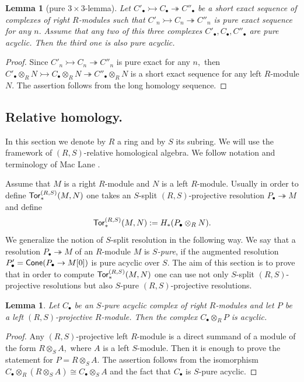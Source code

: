 \documentclass{amsart}
\numberwithin{equation}{section}
\newtheorem{lemma}[theorem]{Lemma}
\theoremstyle{definition}
\def\epi{\twoheadrightarrow}
\def\mono{\rightarrowtail}
\begin{document}
\begin{lemma}[pure $3\times 3$-lemma]\label{lemma_3x3} Let $C'_\bullet \mono C_\bullet \epi C''_\bullet$ be a short exact sequence of complexes of right $R$-modules such that 
$C'_n\mono C_n \epi C''_n$ is pure exact sequence for any $n.$ Assume that any two of this three  complexes $C'_\bullet,C_\bullet,C''_\bullet$ are pure acyclic. Then the third one is also pure acyclic.  
\end{lemma}
\begin{proof}
Since $C'_n\mono C_n \epi C''_n$ is pure exact for any $n,$ then $C'_\bullet \otimes_R N \mono C_\bullet \otimes_R N \epi C''_\bullet\otimes_R N$ is a short exact sequence for any left $R$-module $N.$ The assertion follows from the long homology sequence.
\end{proof}

\subsection{Relative homology.} In this section we denote by $R$ a ring and by $S$ its subring. We will use the framework of  $(R,S)$-relative homological algebra. We follow notation and terminology of Mac Lane \cite[Ch.IX]{maclane2012homology}. 
 
Assume that $M$ is a right $R$-module and $N$ is a left $R$-module. Usually in order to define ${\sf Tor}_*^{(R,S)}(M,N)$ one takes an $S$-split $(R,S)$-projective resolution $P_\bullet\epi M$ and define
$${\sf Tor}_*^{(R,S)}(M,N):=H_*(P_\bullet \otimes_R N).$$ 
We generalize the notion of $S$-split resolution in the following way. 
We say that a resolution $P_\bullet \epi M$ of an $R$-module $M$ is {\it $S$-pure}, if the augmented resolution $P'_\bullet={\sf Cone}(P_\bullet \to M[0])$ is pure acyclic over $S$. The aim of this section is to prove that in order to compute ${\sf Tor}_*^{(R,S)}(M,N)$ one can use not only $S$-split $(R,S)$-projective resolutions but also $S$-pure $(R,S)$-projective resolutions. 

\begin{lemma}\label{lemma_tensor_S-pure} Let $C_\bullet$ be an $S$-pure acyclic complex of right $R$-modules and let $P$ be a left $(R,S)$-projective $R$-module. Then the complex $C_\bullet\otimes_R P$ is acyclic. 
\end{lemma}
\begin{proof}
Any $(R,S)$-projective left $R$-module is a direct summand of a module of the form $R\otimes_S A,$ where $A$ is a left $S$-module. Then it is enough to prove the statement for $P=R\otimes_S A.$ 
The assertion follows from the isomorphism $C_\bullet\otimes_R (R\otimes_S A )\cong C_\bullet \otimes_S A$ and the fact that $C_\bullet$ is $S$-pure acyclic.  
\end{proof}
\end{document}
